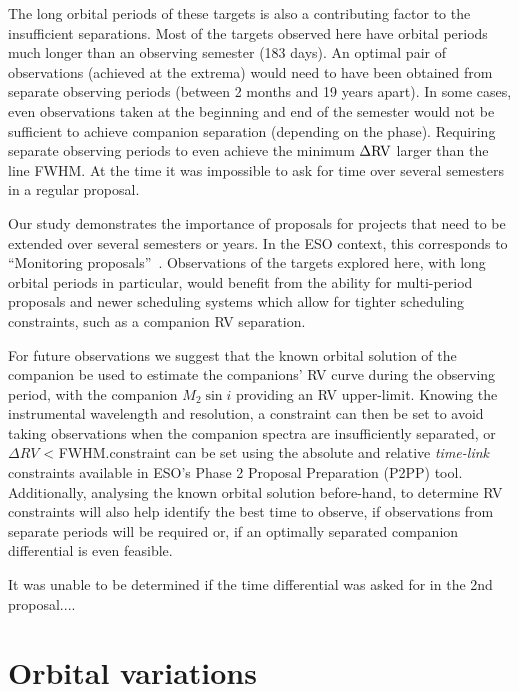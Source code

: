 The long orbital periods of these targets is also a contributing factor to the insufficient separations.
Most of the targets observed here have orbital periods much longer than an observing semester (183 days).
An optimal pair of observations (achieved at the extrema) would need to have been obtained from separate observing periods (between 2 months and 19 years apart).
In some cases, even observations taken at the beginning and end of the semester would not be sufficient to achieve companion separation (depending on the phase).
Requiring separate observing periods to even achieve the minimum \(\Delta \rm {RV}\) larger than the line {FWHM}.
At the time it was impossible to ask for time over several semesters in a regular proposal.

Our study demonstrates the importance of proposals for projects that need to be extended over several semesters or years. In the ESO context, this corresponds to ``Monitoring proposals''~\citep[e.g.,][pg. 18]{eso_eso_2017}. 
Observations of the targets explored here, with long orbital periods in particular, would benefit from the ability for multi-period proposals and newer scheduling systems which allow for tighter scheduling constraints, such as a companion {RV} separation.

For future observations we suggest that the known orbital solution of the companion be used to estimate the companions' {RV} curve during the observing period, with the companion \(M_2\sin{i}\) providing an {RV} upper-limit. 
Knowing the instrumental wavelength and resolution, a constraint can then be set to avoid taking observations when the companion spectra are insufficiently separated, or \(\Delta {RV}\) < {FWHM}.\@This constraint can be set using the absolute and relative \emph{time-link} constraints available in {ESO}'s {Phase 2 Proposal Preparation} (P2PP) tool.
Additionally, analysing the known orbital solution before-hand, to determine {RV} constraints will also help identify the best time to observe, if observations from separate periods will be required or, if an optimally separated companion differential is even feasible.


It was unable to be determined if the time differential was asked for in the 2nd proposal.... 


\section{Orbital variations}

